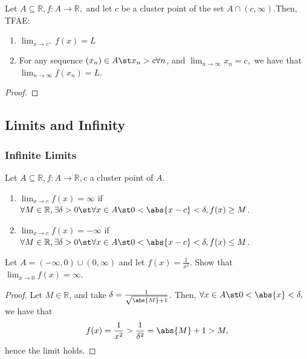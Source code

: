\documentclass[12pt]{article}
\begin{document}
\begin{theorem}\label{thm:sequentialrightlimit}
  Let $A \subseteq \mathbb{R}, f : A \to \mathbb{R},$ and let $c$ be a cluster point of the set \(A \cap (c, \infty).\)Then, TFAE:
  \begin{enumerate}
    \item $\lim_{x\to c^+} f(x) = L$
    \item For any sequence $(x_n) \in A \st x_n > c \forall n$, and $\lim_{n\to\infty} x_n = c,$ we have that $\lim_{n\to\infty} f(x_n) = L$. 
  \end{enumerate}
\end{theorem}
\begin{proof}
\end{proof}

\subsection{Limits and Infinity}
\subsubsection{Infinite Limits}

\begin{definition}
  Let $A \subseteq \mathbb{R}, f : A \to \mathbb{R}, c$ a cluster point of $A$. 
  \begin{enumerate}
    \item $\lim_{x \to c} f(x) = \infty$ if $\forall M \in \mathbb{R}, \exists \delta > 0 \st \forall x \in A \st 0 < \abs{x - c} < \delta, f(x) \geq M$.
    \item $\lim_{x \to c} f(x) = -\infty$ if $\forall M \in \mathbb{R}, \exists \delta > 0 \st \forall x \in A \st 0 < \abs{x - c} < \delta, f(x) \leq M$.
  \end{enumerate}
\end{definition}

\begin{example}
  Let $A = (-\infty, 0) \cup (0, \infty)$ and let $f(x) = \frac{1}{x^2}$. Show that $\lim_{x \to 0} f(x) = \infty$.
  \begin{proof}
    Let $M \in \mathbb{R}$, and take $\delta = \frac{1}{\sqrt{\abs{M} + 1}}$. Then, $\forall x \in A \st 0 < \abs{x} < \delta,$ we have that \[
    f(x) = \frac{1}{x^2} > \frac{1}{\delta^2} = \abs{M}+1   > M,
    \]
    hence the limit holds.
  \end{proof}
\end{example}
\end{document}
